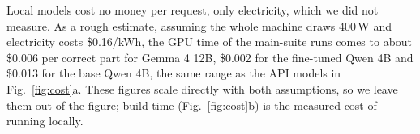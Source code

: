 Local models cost no money per request, only electricity, which we did not measure. As a rough estimate, assuming
the whole machine draws 400\,W and electricity costs \$0.16/kWh, the GPU time of the main-suite runs comes to about
\$0.006 per correct part for Gemma 4 12B, \$0.002 for the fine-tuned Qwen 4B and \$0.013 for the base Qwen 4B, the
same range as the API models in Fig.~\ref{fig:cost}a. These figures scale directly with both assumptions, so we
leave them out of the figure; build time (Fig.~\ref{fig:cost}b) is the measured cost of running locally.

